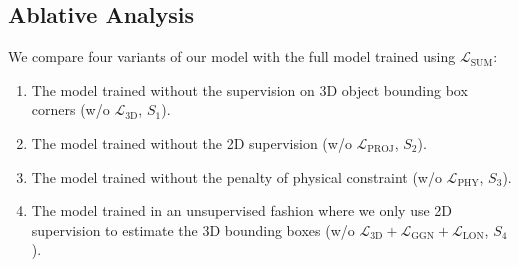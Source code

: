 \documentclass{article}
\begin{document}
\begin{table}[b!]
    \caption{The ablative analysis of the proposed cooperative model on SUN RGB-D. We evaluate holistic scene understanding, 3D mIoU and 2D mIoU of box estimation under different settings.} 
    \setlength{\tabcolsep}{16pt}
    \centering
    \label{tab:analysis}
\end{table}

\subsection{Ablative Analysis}

We compare four variants of our model with the full model trained using $\mathcal{L}_{\text{SUM}}$:
\begin{enumerate}[leftmargin=*,noitemsep,nolistsep]
    \item The model trained without the supervision on 3D object bounding box corners (w/o $\mathcal{L}_{\text{3D}}$, $S_1$).
    \item The model trained without the 2D supervision (w/o $\mathcal{L}_{\text{PROJ}}$, $S_2$).
    \item The model trained without the penalty of physical constraint (w/o $\mathcal{L}_{\text{PHY}}$, $S_3$).
    \item The model trained in an unsupervised fashion where we only use 2D supervision to estimate the 3D bounding boxes (w/o $\mathcal{L}_{\text{3D}}+ \mathcal{L}_{\text{GGN}}+\mathcal{L}_{\text{LON}}$, $S_4$).
\end{enumerate}
\end{document}

